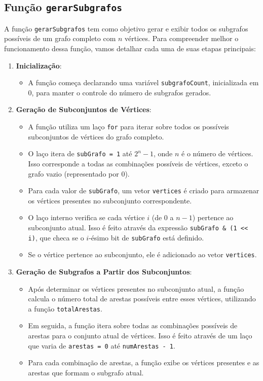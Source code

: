\documentclass{article}
\begin{document}
\subsection{Função \texttt{gerarSubgrafos}}

A função \texttt{gerarSubgrafos} tem como objetivo gerar e exibir todos os subgrafos possíveis de um grafo completo com \(n\) vértices. Para compreender melhor o funcionamento dessa função, vamos detalhar cada uma de suas etapas principais:

\begin{enumerate}
    \item \textbf{Inicialização}:
    \begin{itemize}
        \item A função começa declarando uma variável \texttt{subgrafoCount}, inicializada em 0, para manter o controle do número de subgrafos gerados.
    \end{itemize}

    \item \textbf{Geração de Subconjuntos de Vértices}:
    \begin{itemize}
        \item A função utiliza um laço \texttt{for} para iterar sobre todos os possíveis subconjuntos de vértices do grafo completo. 
        \item O laço itera de \texttt{subGrafo = 1} até \(2^n - 1\), onde \(n\) é o número de vértices. Isso corresponde a todas as combinações possíveis de vértices, exceto o grafo vazio (representado por 0).
        \item Para cada valor de \texttt{subGrafo}, um vetor \texttt{vertices} é criado para armazenar os vértices presentes no subconjunto correspondente. 
        \item O laço interno verifica se cada vértice \(i\) (de 0 a \(n-1\)) pertence ao subconjunto atual. Isso é feito através da expressão \texttt{subGrafo \& (1 << i)}, que checa se o \(i\)-ésimo bit de \texttt{subGrafo} está definido.
        \item Se o vértice pertence ao subconjunto, ele é adicionado ao vetor \texttt{vertices}.
    \end{itemize}

    \item \textbf{Geração de Subgrafos a Partir dos Subconjuntos}:
    \begin{itemize}
        \item Após determinar os vértices presentes no subconjunto atual, a função calcula o número total de arestas possíveis entre esses vértices, utilizando a função \texttt{totalArestas}.
        \item Em seguida, a função itera sobre todas as combinações possíveis de arestas para o conjunto atual de vértices. Isso é feito através de um laço que varia de \texttt{arestas = 0} até \texttt{numArestas - 1}.
        \item Para cada combinação de arestas, a função exibe os vértices presentes e as arestas que formam o subgrafo atual.
    \end{itemize}


\end{enumerate}
\end{document}
